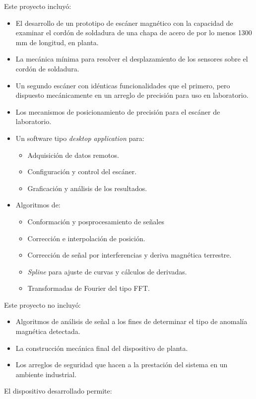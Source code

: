 Este proyecto incluyó:
\begin{itemize}
	\item El desarrollo de un prototipo de escáner magnético con la capacidad de examinar el cordón de soldadura de una chapa de acero de por lo menos 1300 mm de longitud, en planta.
	\item La mecánica mínima para resolver el desplazamiento de los sensores sobre el cordón de soldadura.
	\item Un segundo escáner con idénticas funcionalidades que el primero, pero dispuesto mecánicamente en un arreglo de precisión para uso en laboratorio.
	\item Los mecanismos de posicionamiento de precisión para el escáner de laboratorio.
	\item Un software tipo \textit{desktop application} para:
	\begin{itemize}
		\item Adquisición de datos remotos.
		\item Configuración y control del escáner. 
		\item Graficación y análisis de los resultados.
	\end{itemize}
	\item Algoritmos de: 
	\begin{itemize}
	\item Conformación y posprocesamiento de señales	
	\item Corrección e interpolación de posición.
	\item Corrección de señal por interferencias y deriva magnética terrestre.
	\item \textit{Spline} para ajuste de curvas y cálculos de derivadas.
	\item Transformadas de Fourier del tipo FFT.
	\end{itemize}
\end{itemize}	


Este proyecto no incluyó:
\begin{itemize}
	\item Algoritmos de análisis de señal a los fines de determinar el tipo de anomalía magnética detectada.
	\item La construcción mecánica final del dispositivo de planta.
	\item Los arreglos de seguridad que hacen a la prestación del sistema en un ambiente industrial.
\end{itemize}


El dispositivo desarrollado permite:

